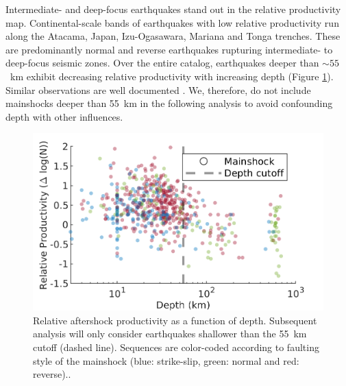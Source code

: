 \documentclass[draft, jgrga]{agujournal2018}
\begin{document}
    Intermediate- and deep-focus earthquakes stand out in the relative productivity map. Continental-scale bands of earthquakes with low relative productivity run along the Atacama, Japan, Izu-Ogasawara, Mariana and Tonga trenches. These are predominantly normal and reverse earthquakes rupturing intermediate- to deep-focus seismic zones. Over the entire catalog, earthquakes deeper than $\sim55$~km exhibit decreasing relative productivity with increasing depth (Figure \ref{fig:prod_vs_depth}). Similar observations are well documented \citep{Bath1965LateralMantle, Frohlich1989TheEarthquakes, Nyffenegger2000, Wiens1997AftershockZone, Wu1999, Houston2004}. We, therefore, do not include mainshocks deeper than 55~km  in the following analysis to avoid confounding depth with other influences.
    
    \begin{figure}
        \centering
        \includegraphics{figures/prod_vs_depth.png}
        \caption{Relative aftershock productivity as a function of depth. Subsequent analysis will only consider earthquakes shallower than the 55~km cutoff (dashed line). Sequences are color-coded according to faulting style of the mainshock (blue: strike-slip, green: normal and red: reverse)..
        }
        \label{fig:prod_vs_depth}
    \end{figure}
    
\end{document}
